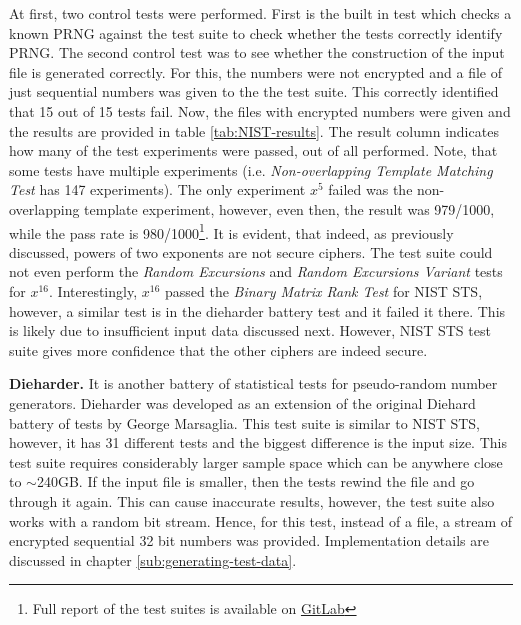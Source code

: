 \documentclass{Resources/UoBLab1}
\theoremstyle{definition}
\begin{document}
At first, two control tests were performed. First is the built in test which checks a known PRNG against the test suite to check whether the tests correctly identify PRNG. The second control test was to see whether the construction of the input file is generated correctly. For this, the numbers were not encrypted and a file of just sequential numbers was given to the the test suite. This correctly identified that 15 out of 15 tests fail. Now, the files with encrypted numbers were given and the results are provided in table \ref{tab:NIST-results}. The result column indicates how many of the test experiments were passed, out of all performed. Note, that some tests have multiple experiments (i.e. \textit{Non-overlapping Template Matching Test} has 147 experiments). The only experiment $x^5$ failed was the non-overlapping template experiment, however, even then, the result was 979/1000, while the pass rate is 980/1000\footnote{Full report of the test suites is available on \href{https://git.cs.bham.ac.uk/projects-2023-24/sxt063/-/tree/main/test-suite-results}{GitLab}}. It is evident, that indeed, as previously discussed, powers of two exponents are not secure ciphers. The test suite could not even perform the \textit{Random Excursions} and \textit{Random Excursions Variant} tests for $x^{16}$. Interestingly, $x^{16}$ passed the \textit{Binary Matrix Rank Test} for NIST STS, however, a similar test is in the dieharder battery test and it failed it there. This is likely due to insufficient input data discussed next. However, NIST STS test suite gives more confidence that the other ciphers are indeed secure.\medskip

\noindent\textbf{Dieharder.} It is another battery of statistical tests for pseudo-random number generators. Dieharder was developed as an extension of the original Diehard battery of tests by George Marsaglia\cite{Diehard}. This test suite is similar to NIST STS, however, it has 31 different tests and the biggest difference is the input size. This test suite requires considerably larger sample space which can be anywhere close to $\sim$240GB. If the input file is smaller, then the tests rewind the file and go through it again. This can cause inaccurate results, however, the test suite also works with a random bit stream. Hence, for this test, instead of a file, a stream of encrypted sequential 32 bit numbers was provided. Implementation details are discussed in chapter \ref{sub:generating-test-data}.
\end{document}
